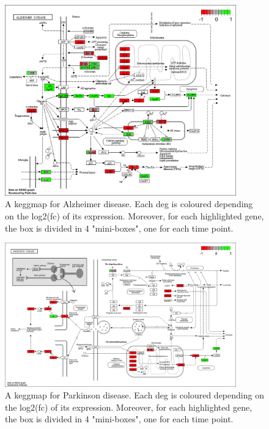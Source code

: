 \begin{figure}[H]
\centering
\includegraphics[width=10cm, keepaspectratio]{img/ticorser/functional/alzheimer.png}
\caption[ticorser alzheimer keggmap]{A keggmap for Alzheimer disease. Each \gls{deg} is coloured depending on the log2(fc) of its expression. Moreover, for each highlighted gene, the box is divided in 4 "mini-boxes", one for each time point.}
\label{fig:ticorseralzheimer}
\end{figure}

\begin{figure}[H]
\centering
\includegraphics[width=10cm, keepaspectratio]{img/ticorser/functional/parkinson.png}
\caption[ticorser parkinson keggmap]{A keggmap for Parkinson disease. Each \gls{deg} is coloured depending on the log2(fc) of its expression. Moreover, for each highlighted gene, the box is divided in 4 "mini-boxes", one for each time point.}
\label{fig:ticorserparkinson}
\end{figure}






